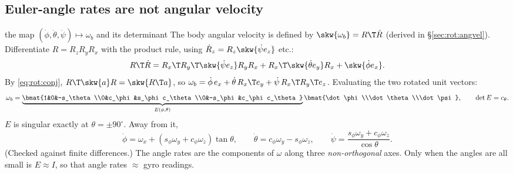 \subsection{Euler-angle rates are not angular velocity}\label{sec:rot:euler-angle-rates}
\begin{deriv}{the map $(\dot\phi,\dot\theta,\dot\psi)\mapsto\omega_b$ and its determinant}
The body angular velocity is defined by $\skw{\omega_b}=R\T\dot R$ (derived in \S\ref{sec:rot:angvel}). Differentiate $R=R_zR_yR_x$ with the product rule, using $\dot R_z=R_z\skw{\dot\psi e_z}$ etc.:
\[
R\T\dot R = R_x\T R_y\T\skw{\dot\psi e_z}R_yR_x + R_x\T\skw{\dot\theta e_y}R_x + \skw{\dot\phi e_x}.
\]
By \eqref{eq:rot:conj}, $R\T\skw{a}R=\skw{R\T a}$, so
$\omega_b=\dot\phi\,e_x+\dot\theta\,R_x\T e_y+\dot\psi\,R_x\T R_y\T e_z$. Evaluating the two rotated unit vectors:
\[
\omega_b=\underbrace{\bmat{1&0&-s_\theta\\0&c_\phi&s_\phi c_\theta\\0&-s_\phi&c_\phi c_\theta}}_{E(\phi,\theta)}\bmat{\dot\phi\\\dot\theta\\\dot\psi},\qquad \det E=c_\theta .
\]
$E$ is singular exactly at $\theta=\pm90^\circ$. Away from it,
\[
\dot\phi=\omega_x+(s_\phi\omega_y+c_\phi\omega_z)\tan\theta,\qquad \dot\theta=c_\phi\omega_y-s_\phi\omega_z,\qquad \dot\psi=\frac{s_\phi\omega_y+c_\phi\omega_z}{\cos\theta}.
\]
(Checked against finite differences.) The angle rates are the components of $\omega$ along three \emph{non-orthogonal} axes. Only when the angles are all small is $E\approx I$, so that angle rates $\approx$ gyro readings.
\end{deriv}
